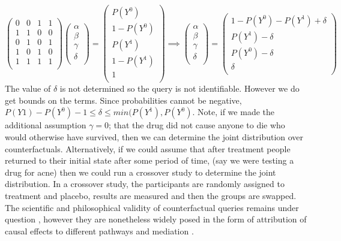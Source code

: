 \documentclass[11pt,a4paper,oneside]{book}
\begin{document}
\begin{equation}
\left(
\begin{array}{cccc}
0&0&1&1\\
1&1&0&0\\
0&1&0&1\\
1&0&1&0\\
1&1&1&1\\
\end{array}
\right)
\left(
\begin{array}{c}
\alpha\\
\beta\\
\gamma\\
\delta\\
\end{array}
\right)= 
\left(
\begin{array}{c}
P(Y^{0})\\
1-P(Y^{0})\\
P(Y^{1})\\
1-P(Y^{1})\\
1\\
\end{array}
\right)
\implies
\left(
\begin{array}{c}
\alpha\\
\beta\\
\gamma\\
\delta\\
\end{array}
\right)=
\left(
\begin{array}{c}
1-P(Y^{0})-P(Y^{1})+\delta\\
P(Y^{1})-\delta\\
P(Y^{0})-\delta\\
\delta\\
\end{array}
\right)
\end{equation}
The value of $\delta$ is not determined so the query is not identifiable. However we do get bounds on the terms. Since probabilities cannot be negative, $P(Y{1})-P(Y^{0})-1 \leq \delta \leq min(P(Y^{1}),P(Y^{0})$. Note, if we made the additional assumption $\gamma=0$; that the drug did not cause anyone to die who would otherwise have survived, then we can determine the joint distribution over counterfactuals. Alternatively, if we could assume that after treatment people returned to their initial state after some period of time, (say we were testing a drug for acne) then we could run a crossover study to determine the joint distribution. In a crossover study, the participants are randomly assigned to treatment and placebo, results are measured and then the groups are swapped. The scientific and philosophical validity of counterfactual queries remains under question \cite{Dawid2000,Dawid2014}, however they are nonetheless widely posed in the form of attribution of causal effects to different pathways and mediation \cite{Pearl2014,Imai2010a,VanderWeele2011}. 
\end{document}
